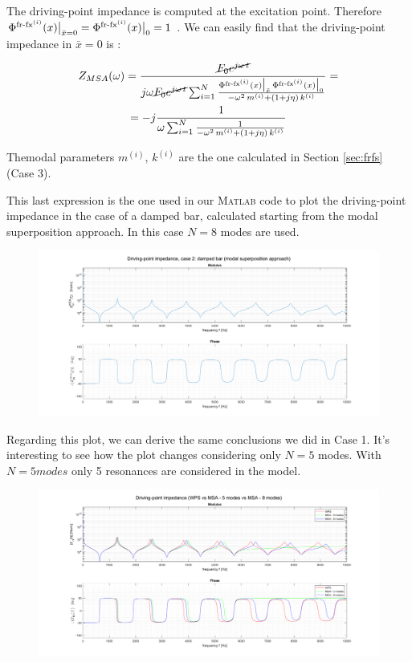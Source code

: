 \documentclass[a4paper,12pt,oneside]{article}
\begin{document}
The driving-point impedance is computed at the excitation point. Therefore $\Phi^{\textup{fr-fx}^{(i)}}(x)\big|_{\bar{x} = 0}  = 
		\Phi^{\textup{fr-fx}^{(i)}}(x)\big|_0 = 1$ .
We can easily find that the driving-point impedance in $\bar{x} = 0$ is :


\begin{gather*}
Z_{MSA} (\omega ) =
	\frac{\cancel{F_0 e^{j \omega \, t}}}{
	j \omega \cancel{F_0 e^{j \omega \, t}}
		\sum_{i=1}^N \frac{\Phi^{\textup{fr-fx}^{(i)}}(x)\big|_{\bar{x}} \,
		\Phi^{\textup{fr-fx}^{(i)}}(x)\big|_0 }
		{-\omega^2 \, m^{(i)} + (1 + j \eta) \, k^{(i)}}
	}	
= \\
= -j \frac{1}{\omega
		\sum_{i=1}^N \frac{1}
		{-\omega^2 \, m^{(i)} + (1 + j \eta) \, k^{(i)}}}
\end{gather*} 

Themodal parameters $m^{(i)}, \, k^{(i)}$ are the one calculated in Section \ref{sec:frfs} (Case 3).

This last expression is the one used in our \textsc{Matlab} code to plot the driving-point impedance in the case of a damped bar, calculated starting from the modal superposition approach. In this case $N=8$ modes are used.

\begin{figure}[h]
	\hspace{-70pt}
	\includegraphics[scale=0.4]{impedance_modal_superposition_approach}
\end{figure}

Regarding this plot, we can derive the same conclusions we did in Case 1.
It's interesting to see how the plot changes considering only $N=5$ modes. With $N=5 modes$ only 5 resonances are considered in the model.

\begin{figure}[h]
	\hspace{-70pt}
	\includegraphics[scale=0.4]{impedance_wps_vs_msa}
\end{figure}
\end{document}
